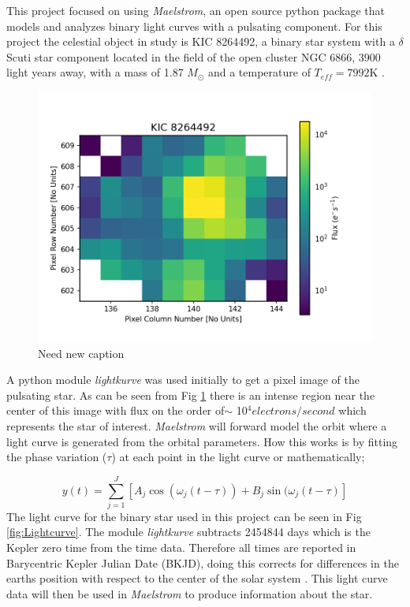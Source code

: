 \documentclass[]{article}
\begin{document}
This project focused on using \textit{Maelstrom}, an open source python package that models and analyzes binary light curves with a pulsating component.
For this project the celestial object in study is KIC 8264492, a binary star system with a $\delta$ Scuti star component located in the field of the open cluster NGC 6866, 3900 light years away, with a mass of 1.87 $M_{\odot}$ and a temperature of $T_{eff} = 7992$K \cite{balona2013pulsation,shibahashi2015fm}. 

\begin{figure}[H]
    \centering
    \includegraphics[width=1\linewidth]{Recover_Binary.png}
    \caption{Need new caption}
    \label{fig:Recover_Binary}
\end{figure}


A python module \textit{lightkurve} was used initially to get a pixel image of the pulsating star. 
As can be seen from Fig \ref{fig:Recover_Binary} there is an intense region near the center of this image with flux on the order of$\sim$ 10$^4 electrons/second$ which represents the star of interest.
\textit{Maelstrom} will forward model the orbit where a light curve is generated from the orbital parameters. How this works is by fitting the phase variation ($\tau$) at each point in the light curve or mathematically;

\begin{equation}
    y(t) = \sum_{j = 1}^{J} [A_j \cos(\omega_j (t - \tau)) + B_j \sin(\omega_j (t - \tau) ]
\end{equation}
\noindent
The light curve for the binary star used in this project can be seen in Fig \ref{fig:Lightcurve}.
The module \textit{lightkurve} subtracts 2454844 days which is the Kepler zero time from the time data. 
Therefore all times are reported in Barycentric Kepler Julian Date (BKJD), doing this corrects for differences in the earths position with respect to the center of the solar system \cite{Eastman_2010}. 
This light curve data will then be used in \textit{Maelstrom} to produce information about the star.
\end{document}
